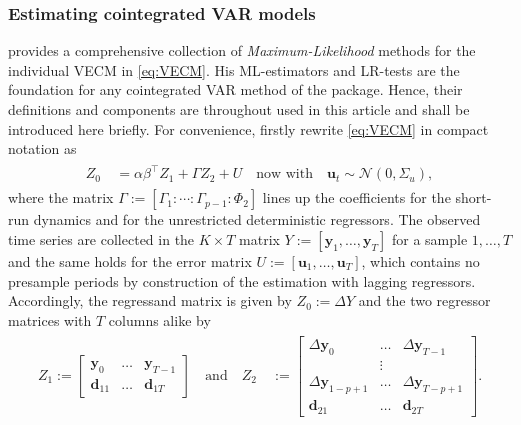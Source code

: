 \subsubsection{Estimating cointegrated VAR models} \label{sec:IndivEst}
\citet{Johansen1991,Johansen1996} provides a comprehensive collection of \textit{Maximum-Likelihood} methods for the individual VECM in \eqref{eq:VECM}. His ML-estimators and LR-tests are the foundation for any cointegrated VAR method of the  package. Hence, their definitions and components are throughout used in this article and shall be introduced here briefly. For convenience, firstly rewrite \eqref{eq:VECM} in compact notation as
\begin{align} \label{eq:compactVECM}
\begin{split}
	Z_{0} \ & = \alpha\beta^\top Z_{1} + \Gamma Z_{2} + U \quad \text{now with} \quad \boldsymbol{u}_{t} \sim \mathcal{N}(0,\Sigma_u),
\end{split}
\end{align}
where the matrix $ \Gamma := \left[ \Gamma_1 : \cdots : \Gamma_{p-1} : \Phi_2 \right] $ lines up the coefficients for the short-run dynamics and for the unrestricted deterministic regressors. The observed time series are collected in the $ K \times T $ matrix $ Y := \left[ \boldsymbol{y}_{1}, \ldots, \boldsymbol{y}_{T} \right] $ for a sample $ 1,\ldots,T $ and the same holds for the error matrix $ U := \left[ \boldsymbol{u}_{1}, \ldots, \boldsymbol{u}_{T} \right] $, which contains no presample periods by construction of the estimation with lagging regressors. Accordingly, the regressand matrix is given by $Z_0 := \Delta Y $ and the two regressor matrices with $ T $ columns alike by
\begin{align} \label{eq:compactRegressor}
\begin{split}
	Z_1 := 
	\begin{bmatrix} 
		\boldsymbol{y}_{0}  & \ldots & \boldsymbol{y}_{T-1} \\ 
		\boldsymbol{d}_{11} & \ldots & \boldsymbol{d}_{1T} 
	\end{bmatrix}
	\quad \text{and} \quad
	Z_{2} \ & := 
	\begin{bmatrix}
		\Delta \boldsymbol{y}_{0}     & \ldots & \Delta \boldsymbol{y}_{T-1} \\
		                              & \vdots &                             \\
		\Delta \boldsymbol{y}_{1-p+1} & \ldots & \Delta \boldsymbol{y}_{T-p+1} \\
		\boldsymbol{d}_{21}           & \ldots & \boldsymbol{d}_{2T}
	\end{bmatrix}.
\end{split}
\end{align} 
